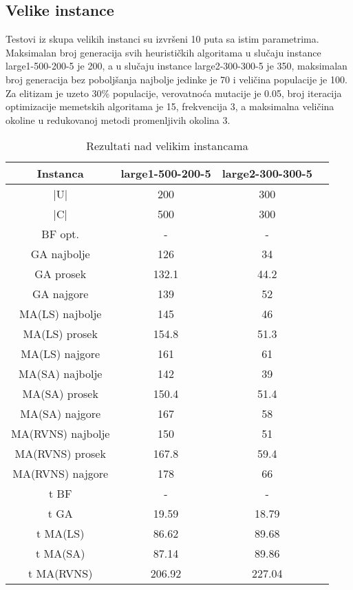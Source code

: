 \documentclass[12pt, a4paper]{article}
\theoremstyle{definition}
\begin{document}
\subsection{Velike instance}

Testovi iz skupa velikih instanci su izvršeni 10 puta sa istim parametrima. Maksimalan broj generacija svih heurističkih algoritama u slučaju instance large1-500-200-5 je 200, a u slučaju instance large2-300-300-5 je 350, maksimalan broj generacija bez poboljšanja najbolje jedinke je 70 i veličina populacije je 100. Za elitizam je uzeto 30\% populacije, verovatnoća mutacije je 0.05, broj iteracija optimizacije memetskih algoritama je 15, frekvencija 3, a maksimalna veličina okoline u redukovanoj metodi promenljivih okolina 3.

\begin{table}[H]
\label{tab:3}
\begin{adjustbox}{width=\columnwidth,center}
\begin{tabular}{ |c|c|c|c| }
\hline
Instanca & large1-500-200-5 & large2-300-300-5 \\
\hline
|U| & 200 & 300 \\
\hline
|C| & 500 & 300 \\
\hline
BF opt. & - & - \\
\hline
GA najbolje & 126 & 34 \\
\hline
GA prosek & 132.1 & 44.2 \\
\hline
GA najgore & 139 & 52 \\
\hline
MA(LS) najbolje & 145 & 46 \\
\hline
MA(LS) prosek & 154.8 & 51.3 \\
\hline
MA(LS) najgore & 161 & 61 \\
\hline
MA(SA) najbolje & 142 & 39 \\
\hline
MA(SA) prosek & 150.4 & 51.4 \\
\hline
MA(SA) najgore & 167 & 58 \\
\hline
MA(RVNS) najbolje & 150 & 51 \\
\hline
MA(RVNS) prosek & 167.8 & 59.4 \\
\hline
MA(RVNS) najgore & 178 & 66 \\
\hline
t BF & - & - \\
\hline
t GA & 19.59 & 18.79 \\
\hline
t MA(LS) & 86.62 & 89.68 \\
\hline
t MA(SA) & 87.14 & 89.86 \\
\hline
t MA(RVNS) & 206.92 & 227.04 \\
\hline
\end{tabular}
\end{adjustbox}
\caption{Rezultati nad velikim instancama}
\end{table}
\end{document}
